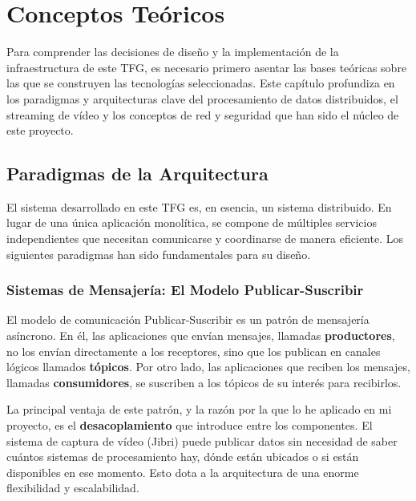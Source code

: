 \chapter{Conceptos Teóricos}
\label{chap:conceptos}

Para comprender las decisiones de diseño y la implementación de la infraestructura de este TFG, es necesario primero asentar las bases teóricas sobre las que se construyen las tecnologías seleccionadas. Este capítulo profundiza en los paradigmas y arquitecturas clave del procesamiento de datos distribuidos, el streaming de vídeo y los conceptos de red y seguridad que han sido el núcleo de este proyecto.

\section{Paradigmas de la Arquitectura}
\label{sec:conceptos_arquitecturas}
El sistema desarrollado en este TFG es, en esencia, un sistema distribuido. En lugar de una única aplicación monolítica, se compone de múltiples servicios independientes que necesitan comunicarse y coordinarse de manera eficiente. Los siguientes paradigmas han sido fundamentales para su diseño.

\subsection{Sistemas de Mensajería: El Modelo Publicar-Suscribir}
El modelo de comunicación Publicar-Suscribir es un patrón de mensajería asíncrono. En él, las aplicaciones que envían mensajes, llamadas \textbf{productores}, no los envían directamente a los receptores, sino que los publican en canales lógicos llamados \textbf{tópicos}. Por otro lado, las aplicaciones que reciben los mensajes, llamadas \textbf{consumidores}, se suscriben a los tópicos de su interés para recibirlos.

La principal ventaja de este patrón, y la razón por la que lo he aplicado en mi proyecto, es el \textbf{desacoplamiento} que introduce entre los componentes. El sistema de captura de vídeo (Jibri) puede publicar datos sin necesidad de saber cuántos sistemas de procesamiento hay, dónde están ubicados o si están disponibles en ese momento. Esto dota a la arquitectura de una enorme flexibilidad y escalabilidad.

